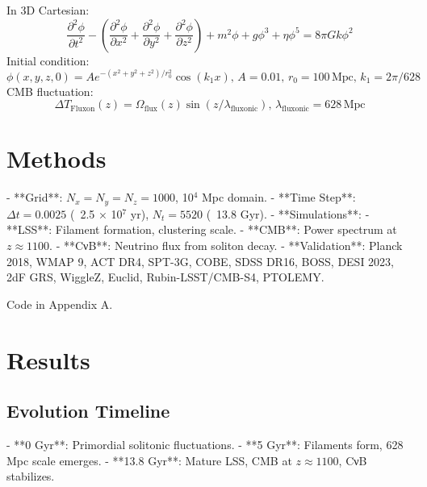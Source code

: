 \documentclass[11pt]{article}
\begin{document}
In 3D Cartesian:
\begin{equation}
\frac{\partial^2 \phi}{\partial t^2} - \left( \frac{\partial^2 \phi}{\partial x^2} + \frac{\partial^2 \phi}{\partial y^2} + \frac{\partial^2 \phi}{\partial z^2} \right) + m^2 \phi + g \phi^3 + \eta \phi^5 = 8\pi G k \phi^2
\end{equation}
Initial condition:
\begin{equation}
\phi(x, y, z, 0) = A e^{-(x^2 + y^2 + z^2) / r_0^2} \cos(k_1 x), \, A = 0.01, \, r_0 = 100 \, \text{Mpc}, \, k_1 = 2\pi / 628
\end{equation}
CMB fluctuation:
\begin{equation}
\Delta T_{\text{Fluxon}}(z) = \Omega_{\text{flux}}(z) \sin(z / \lambda_{\text{fluxonic}}), \, \lambda_{\text{fluxonic}} = 628 \, \text{Mpc}
\end{equation}

\section{Methods}
- **Grid**: \(N_x = N_y = N_z = 1000\), 10$^4$ Mpc domain.
- **Time Step**: \(\Delta t = 0.0025\) (~2.5 × 10$^7$ yr), \(N_t = 5520\) (~13.8 Gyr).
- **Simulations**:
  - **LSS**: Filament formation, clustering scale.
  - **CMB**: Power spectrum at \(z \approx 1100\).
  - **CνB**: Neutrino flux from soliton decay.
- **Validation**: Planck 2018, WMAP 9, ACT DR4, SPT-3G, COBE, SDSS DR16, BOSS, DESI 2023, 2dF GRS, WiggleZ, Euclid, Rubin-LSST/CMB-S4, PTOLEMY.

Code in Appendix A.

\section{Results}
\subsection{Evolution Timeline}
- **0 Gyr**: Primordial solitonic fluctuations.
- **5 Gyr**: Filaments form, 628 Mpc scale emerges.
- **13.8 Gyr**: Mature LSS, CMB at \(z \approx 1100\), CνB stabilizes.
\end{document}
